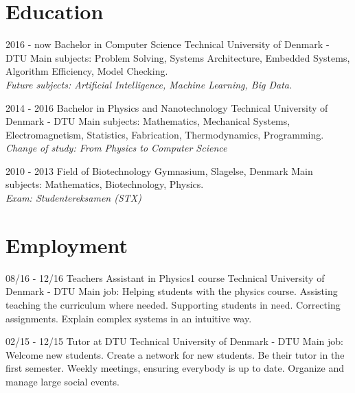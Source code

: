 \documentclass[]{friggeri-cv}
\begin{document}
\section{Education}
\begin{entrylist}
  \entry
    {2016 - now}
    {Bachelor in Computer Science}
    {Technical University of Denmark - DTU}
    {Main subjects: Problem Solving, Systems Architecture, Embedded Systems, Algorithm Efficiency, Model Checking.\\
    \emph{Future subjects: Artificial Intelligence, Machine Learning, Big Data.\\}}
    
  \entry
    {2014 - 2016}
    {Bachelor in Physics and Nanotechnology}
    {Technical University of Denmark - DTU}
    {Main subjects: Mathematics, Mechanical Systems, Electromagnetism, Statistics, Fabrication, Thermodynamics, Programming.\\
    \emph{Change of study: From Physics to Computer Science\\}}
    
  \entry
    {2010 - 2013}
    {Field of Biotechnology}
    {Gymnasium, Slagelse, Denmark}
    {Main subjects: Mathematics, Biotechnology, Physics. \\
    \emph{Exam: Studentereksamen (STX)}}
    
\end{entrylist}


\section{Employment}
\begin{entrylist}
  \entry
    {08/16 - 12/16}
    {Teachers Assistant in Physics1 course}
    {Technical University of Denmark - DTU}
    {Main job: Helping students with the physics course. Assisting teaching the curriculum where needed. Supporting students in need. Correcting assignments. Explain complex systems in an intuitive way.\\}
    
  \entry
    {02/15 - 12/15}
    {Tutor at DTU}
    {Technical University of Denmark - DTU}
    {Main job: Welcome new students. Create a network for new students. Be their tutor in the first semester. Weekly meetings, ensuring everybody is up to date. Organize and manage large social events.
    \\}
    
    
\end{entrylist}
\end{document}
